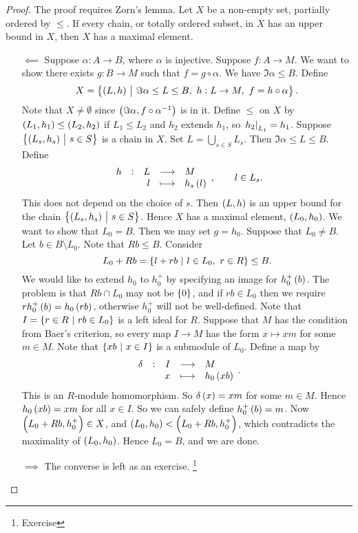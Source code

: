 \begin{proof}
The proof requires Zorn's lemma. Let $ X $ be a non-empty set, partially ordered by $ \le $. If every chain, or totally ordered subset, in $ X $ has an upper bound in $ X $, then $ X $ has a maximal element.
\begin{itemize}
\item[$ \impliedby $] Suppose $ \alpha : A \to B $, where $ \alpha $ is injective. Suppose $ f : A \to M $. We want to show there exists $ g : B \to M $ such that $ f = g \circ \alpha $. We have $ \Im \alpha \le B $. Define
$$ X = \cbr{\br{L, h} \st \Im \alpha \le L \le B, \ h : L \to M, \ f = h \circ \alpha}. $$
Note that $ X \ne \emptyset $ since $ \br{\Im \alpha, f \circ \alpha^{-1}} $ is in it. Define $ \le $ on $ X $ by $ \br{L_1, h_1} \le \br{L_2, h_2} $ if $ L_1 \le L_2 $ and $ h_2 $ extends $ h_1 $, so $ \left. h_2 \right|_{L_1} = h_1 $. Suppose $ \cbr{\br{L_s, h_s} \st s \in S} $ is a chain in $ X $. Set $ L = \bigcup_{s \in S} L_s $. Then $ \Im \alpha \le L \le B $. Define
$$ \function[h]{L}{M}{l}{h_s\br{l}}, \qquad l \in L_s. $$
This does not depend on the choice of $ s $. Then $ \br{L, h} $ is an upper bound for the chain $ \cbr{\br{L_s, h_s} \st s \in S} $. Hence $ X $ has a maximal element, $ \br{L_0, h_0} $. We want to show that $ L_0 = B $. Then we may set $ g = h_0 $. Suppose that $ L_0 \ne B $. Let $ b \in B \setminus L_0 $. Note that $ Rb \le B $. Consider
$$ L_0 + Rb = \cbr{l + rb \st l \in L_0, \ r \in R} \le B. $$
We would like to extend $ h_0 $ to $ h_0^+ $ by specifying an image for $ h_0^+\br{b} $. The problem is that $ Rb \cap L_0 $ may not be $ \cbr{0} $, and if $ rb \in L_0 $ then we require $ rh_0^+\br{b} = h_0\br{rb} $, otherwise $ h_0^+ $ will not be well-defined. Note that $ I = \cbr{r \in R \st rb \in L_0} $ is a left ideal for $ R $. Suppose that $ M $ has the condition from Baer's criterion, so every map $ I \to M $ has the form $ x \mapsto xm $ for some $ m \in M $. Note that $ \cbr{xb \st x \in I} $ is a submodule of $ L_0 $. Define a map by
$$ \function[\delta]{I}{M}{x}{h_0\br{xb}}. $$
This is an $ R $-module homomorphism. So $ \delta\br{x} = xm $ for some $ m \in M $. Hence $ h_0\br{xb} = xm $ for all $ x \in I $. So we can safely define $ h_0^+\br{b} = m $. Now $ \br{L_0 + Rb, h_0^+} \in X $, and $ \br{L_0, h_0} < \br{L_0 + Rb, h_0^+} $, which contradicts the maximality of $ \br{L_0, h_0} $. Hence $ L_0 = B $, and we are done.
\item[$ \implies $] The converse is left as an exercise. \footnote{Exercise}
\end{itemize}
\end{proof}

